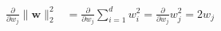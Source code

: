 \newcommand{\matrix}[1]{\mathbf{#1}}
\newcommand{\vector}[1]{\mathbf{#1}}
\newcommand{\X}{\matrix{X}}
\newcommand{\y}{\vector{y}}
\newcommand{\w}{\vector{w}}
\newcommand{\r}{\vector{r}}
\begin{align*}
\frac{\partial}{\partial w_j} \|\w\|_2^2 &= \frac{\partial}{\partial w_j} \sum_{i=1}^d w_i^2 = \frac{\partial}{\partial w_j} w_j^2 = 2 w_j
\end{align*}
